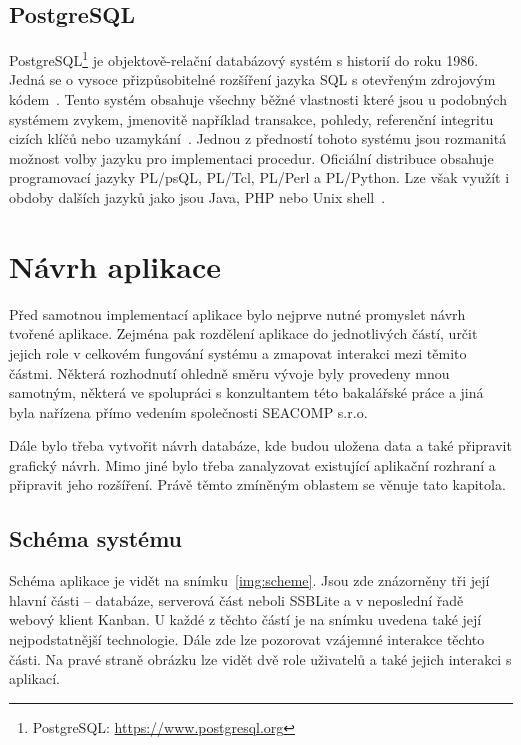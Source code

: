 \section{PostgreSQL}
PostgreSQL\footnote{PostgreSQL: \url{https://www.postgresql.org}} je objektově-relační databázový systém s historií do roku 1986. Jedná se o vysoce přizpůsobitelné rozšíření jazyka SQL s otevřeným zdrojovým kódem~\cite{bib:postgre}. Tento systém obsahuje všechny běžné vlastnosti které jsou u podobných systémem zvykem, jmenovitě například transakce, pohledy, referenční integritu cizích klíčů nebo uzamykání~\cite{bib:postgre-begin}. Jednou z předností tohoto systému jsou rozmanitá možnost volby jazyku pro implementaci procedur. Oficiální distribuce obsahuje programovací jazyky PL/psQL, PL/Tcl, PL/Perl a PL/Python. Lze však využít i obdoby dalších jazyků jako jsou Java, PHP nebo Unix shell~\cite{bib:postgre-lang}. 





\chapter{Návrh aplikace}
Před samotnou implementací aplikace bylo nejprve nutné promyslet návrh tvořené aplikace. Zejména pak rozdělení aplikace do jednotlivých částí, určit jejich role v celkovém fungování systému a zmapovat interakci mezi těmito částmi. Některá rozhodnutí ohledně směru vývoje byly provedeny mnou samotným, některá ve spolupráci s konzultantem této bakalářské práce a jiná byla nařízena přímo vedením společnosti SEACOMP s.r.o.

Dále bylo třeba vytvořit návrh databáze, kde budou uložena data a také připravit grafický návrh. Mimo jiné bylo třeba zanalyzovat existující aplikační rozhraní a připravit jeho rozšíření. 
Právě těmto zmíněným oblastem se věnuje tato kapitola.




\section{Schéma systému}
Schéma aplikace je vidět na snímku~\ref{img:scheme}. Jsou zde znázorněny tři její hlavní části -- databáze, serverová část neboli SSBLite a v neposlední řadě webový klient Kanban. U každé z těchto částí je na snímku uvedena také její nejpodstatnější technologie. Dále zde lze pozorovat vzájemné interakce těchto části. Na pravé straně obrázku lze vidět dvě role uživatelů a také jejich interakci s aplikací.

